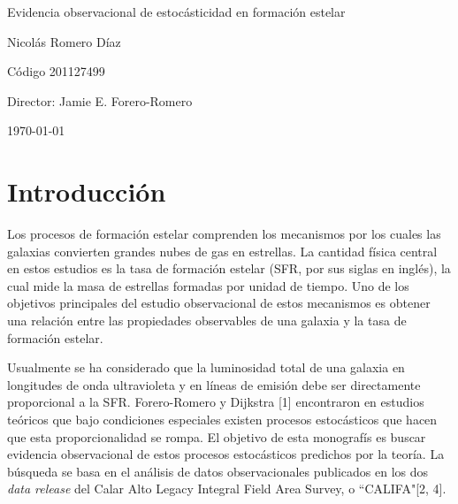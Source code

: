 \documentclass[12pt]{article}
\begin{document}
\begin{center}
\Huge
Evidencia observacional de estoc\'asticidad en formaci\'on estelar

\vspace{3mm}
\Large Nicol\'as Romero D\'iaz

\large
C\'odigo 201127499


\vspace{2mm}
\Large
Director: Jamie E. Forero-Romero

\normalsize
\vspace{2mm}

\today
\end{center}


\normalsize
\section{Introducci\'on}


Los procesos de formaci\'on estelar comprenden los mecanismos por los
cuales las galaxias convierten grandes nubes de gas en estrellas. 
La cantidad f\'isica central en estos estudios es la tasa de
formaci\'on estelar (SFR, por sus siglas en ingl\'es), la cual mide
la masa de estrellas formadas por unidad de tiempo.
Uno de los objetivos principales del estudio observacional de estos
mecanismos es obtener una relaci\'on entre las propiedades observables
de una galaxia y la tasa de formaci\'on estelar.
 



Usualmente se ha considerado que la luminosidad total de una galaxia
en longitudes de onda ultravioleta y en l\'ineas de emisi\'on debe ser
directamente proporcional a la SFR.
Forero-Romero y Dijkstra [1] encontraron en estudios te\'oricos que
bajo condiciones especiales existen procesos estoc\'asticos que hacen
que esta proporcionalidad se rompa. 
El objetivo de esta monograf\'is es buscar evidencia observacional de
estos procesos estoc\'asticos predichos por la teor\'ia.
La b\'usqueda se 
basa en el an\'alisis de datos observacionales publicados en los dos
\textit{data release} del Calar Alto Legacy Integral Field Area
Survey, o ``CALIFA"[2, 4]. 
\end{document}
